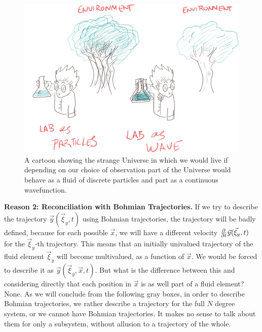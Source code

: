 \documentclass[11pt, a4paper]{article} %
\begin{document}
\begin{figure}[h!]
  \centering
    \includegraphics[width=0.64\linewidth]{labEnvironment.png}
  \caption{A cartoon showing the strange Universe in which we would live if depending on our choice of observation part of the Universe would behave as a fluid of discrete particles and part as a continuous wavefunction. }
  \label{fig:jocoso}
\end{figure}

{\bf Reason 2: Reconciliation with Bohmian Trajectories.} If we try to describe the trajectory $\vec{y}(\vec{\xi}_y,t)$ using Bohmian trajectories, the trajectory will be badly defined, because for each possible $\vec{x}$, we will have a different velocity $\pdv{}{t}\vec{y}(\vec{\xi}_y,t)$ for the $\vec{\xi}_y$-th trajectory. This means that an initially univalued trajectory of the fluid element $\vec{\xi}_y$ will become multivalued, as a function of $\vec{x}$. We would be forced to describe it as $\vec{y}(\vec{\xi}_y, \vec{x},t)$. But what is the difference between this and considering directly that each position in $\vec{x}$ is as well part of a fluid element? None. As we will conclude from the following gray boxes, in order to describe Bohmian trajectories, we rather describe a trajectory for the full $N$ degree system, or we cannot have Bohmian trajectories. It makes no sense to talk about them for only a subsystem, without allusion to a trajectory of the whole.
\vspace{0.2cm}
\end{document}
